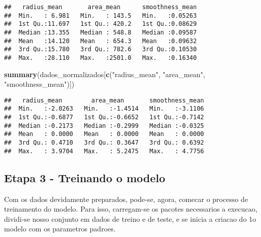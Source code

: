 \documentclass[]{article}
\newenvironment{Shaded}{\begin{snugshade}}{\end{snugshade}}
\newcommand{\KeywordTok}[1]{\textcolor[rgb]{0.13,0.29,0.53}{\textbf{#1}}}
\newcommand{\StringTok}[1]{\textcolor[rgb]{0.31,0.60,0.02}{#1}}
\newcommand{\NormalTok}[1]{#1}
\begin{document}
\begin{verbatim}
##   radius_mean       area_mean      smoothness_mean  
##  Min.   : 6.981   Min.   : 143.5   Min.   :0.05263  
##  1st Qu.:11.697   1st Qu.: 420.2   1st Qu.:0.08629  
##  Median :13.355   Median : 548.8   Median :0.09587  
##  Mean   :14.120   Mean   : 654.3   Mean   :0.09632  
##  3rd Qu.:15.780   3rd Qu.: 782.6   3rd Qu.:0.10530  
##  Max.   :28.110   Max.   :2501.0   Max.   :0.16340
\end{verbatim}

\begin{Shaded}
\begin{Highlighting}[]
\KeywordTok{summary}\NormalTok{(dados_normalizados[}\KeywordTok{c}\NormalTok{(}\StringTok{"radius_mean"}\NormalTok{, }\StringTok{"area_mean"}\NormalTok{, }\StringTok{"smoothness_mean"}\NormalTok{)])}
\end{Highlighting}
\end{Shaded}

\begin{verbatim}
##   radius_mean        area_mean       smoothness_mean  
##  Min.   :-2.0263   Min.   :-1.4514   Min.   :-3.1106  
##  1st Qu.:-0.6877   1st Qu.:-0.6652   1st Qu.:-0.7142  
##  Median :-0.2173   Median :-0.2999   Median :-0.0325  
##  Mean   : 0.0000   Mean   : 0.0000   Mean   : 0.0000  
##  3rd Qu.: 0.4710   3rd Qu.: 0.3647   3rd Qu.: 0.6392  
##  Max.   : 3.9704   Max.   : 5.2475   Max.   : 4.7756
\end{verbatim}

\subsection{Etapa 3 - Treinando o
modelo}\label{etapa-3---treinando-o-modelo}

Com os dados devidamente preparados, pode-se, agora, comecar o processo
de treinamento do modelo. Para isso, carregam-se os pacotes necessarios
a execucao, dividi-se nosso conjunto em dados de treino e de teste, e se
inicia a criacao do 1o modelo com os parametros padroes.
\end{document}

